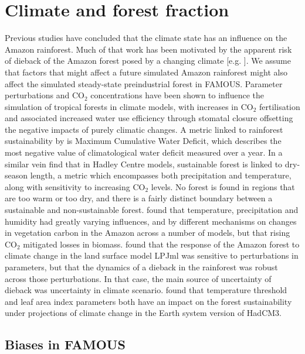 \documentclass[gmd, manuscript]{copernicus}
\begin{document}
\section{Climate and forest fraction}\label{sec:climate_and_frac}

Previous studies have concluded that the climate state has an influence on the Amazon rainforest. Much of that work has been motivated by the apparent risk of dieback of the Amazon forest posed by a changing climate [e.g. \cite{malhi2008climate, cox2004amazonian}].  We assume that factors that might affect a future simulated Amazon rainforest might also affect the simulated steady-state preindustrial forest in FAMOUS. Parameter perturbations and CO$_{2}$ concentrations have been shown to influence the simulation of tropical forests in climate models, with increases in CO$_{2}$ fertilisation and associated increased water use efficiency through stomatal closure offsetting the negative impacts of purely climatic changes. A metric linked to rainforest sustainability by \cite{malhi2009exploring} is Maximum Cumulative Water Deficit, which describes the most negative value of climatological water deficit measured over a year. In a similar vein \cite{Good2011, Good2013} find that in Hadley Centre models, sustainable forest is linked to dry-season length, a metric which encompasses both precipitation and temperature, along with sensitivity to increasing CO$_{2}$ levels. No forest is found in regions that are too warm or too dry, and there is a fairly distinct boundary between a sustainable and non-sustainable forest. \cite{Galbraith2010} found that temperature, precipitation and humidity had greatly varying influences, and by different mechanisms on changes in vegetation carbon in the Amazon across a number of models, but that rising CO$_{2}$ mitigated losses in biomass. \cite{POULTER2010} found that the response of the Amazon forest to climate change in the land surface model LPJml was sensitive to perturbations in parameters, but that the dynamics of a dieback in the rainforest was robust across those perturbations. In that case, the main source of uncertainty of dieback was uncertainty in climate scenario. \cite{boulton2017exploring} found that temperature threshold and leaf area index parameters both have an impact on the forest sustainability under projections of climate change in the Earth system version of HadCM3.

\subsection{Biases in FAMOUS}\label{ssec:biases}
\end{document}
